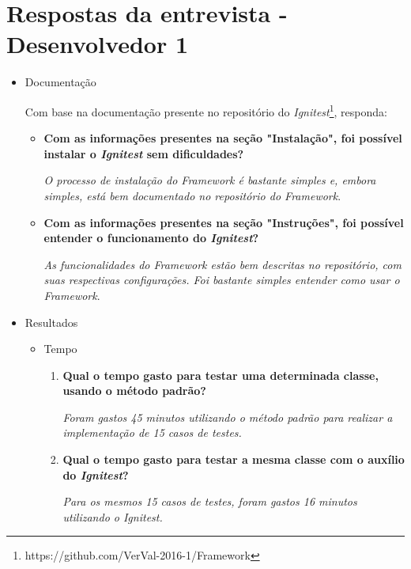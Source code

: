 \chapter{Respostas da entrevista - Desenvolvedor 1}
    
    \begin{itemize}
        \item Documentação
        
            Com base na documentação presente no repositório do \textit{Ignitest}\footnote{https://github.com/VerVal-2016-1/Framework}, responda:
            \begin{itemize}
                \item \textbf{Com as informações presentes na seção "Instalação", foi possível instalar o \textit{Ignitest} sem dificuldades?}
		    
		    \subitem \textit{O processo de instalação do Framework é bastante simples e, embora simples, está bem documentado no 
			      repositório do Framework}.
		    
                \item \textbf{Com as informações presentes na seção "Instruções", foi possível entender o funcionamento do \textit{Ignitest}?}
		     
		     \subitem \textit{As funcionalidades do Framework estão bem descritas no repositório, com suas respectivas configurações.
			      Foi bastante simples entender como usar o Framework}.
		     
            \end{itemize}
            
        \item Resultados
            \begin{itemize}
                \item Tempo
                    \begin{enumerate}
                        \item \textbf{Qual o tempo gasto para testar uma determinada classe, usando o método padrão?}
			  
			  \subitem \textit{Foram gastos 45 minutos utilizando o método padrão para realizar a implementação de 15 casos de testes.}
			  
                        \item \textbf{Qual o tempo gasto para testar a mesma classe com o auxílio do \textit{Ignitest}?}
			  
			  \subitem \textit{Para os mesmos 15 casos de testes, foram gastos 16 minutos utilizando o Ignitest.}
                        

\end{enumerate}
\end{itemize}
\end{itemize}
